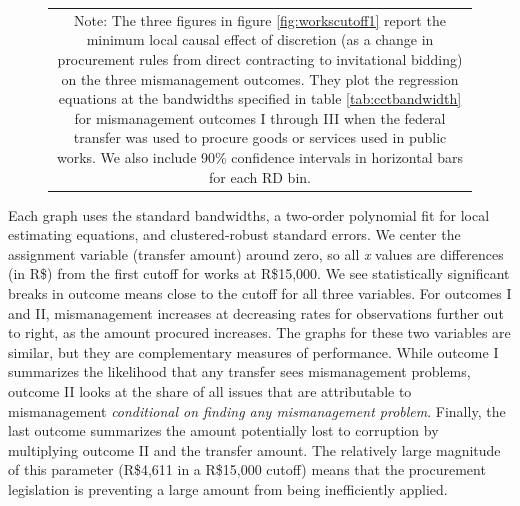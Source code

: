\documentclass[11pt]{article}
\begin{document}
\begin{figure}[!htbp]
\begin{tabular}{ccc}
  \multicolumn{3}{p{\textwidth}}{\scriptsize Note: The three figures in figure \ref{fig:workscutoff1} report the minimum local causal effect of discretion (as a change in procurement rules from direct contracting to invitational bidding) on the three mismanagement outcomes. They plot the regression equations at the bandwidths specified in table \ref{tab:cctbandwidth} for mismanagement outcomes I through III when the federal transfer was used to procure goods or services used in public works. We also include 90\% confidence intervals in horizontal bars for each RD bin.}
  \end{tabular}
\end{figure}

Each graph uses the standard \citet{CalonicoOptimalDataDrivenRegression2015} bandwidths, a two-order polynomial fit for local estimating equations, and clustered-robust standard errors. We center the assignment variable (transfer amount) around zero, so all \emph{x} values are differences (in R\$) from the first cutoff for works at R\$15,000. We see statistically significant breaks in outcome means close to the cutoff for all three variables. For outcomes I and II, mismanagement increases at decreasing rates for observations further out to right, as the amount procured increases. The graphs for these two variables are similar, but they are complementary measures of performance. While outcome I summarizes the likelihood that any transfer sees mismanagement problems, outcome II looks at the share of all issues that are attributable to mismanagement \emph{conditional on finding any mismanagement problem}. Finally, the last outcome summarizes the amount potentially lost to corruption by multiplying outcome II and the transfer amount. The relatively large magnitude of this parameter (R\$4,611 in a R\$15,000 cutoff) means that the procurement legislation is preventing a large amount from being inefficiently applied.
\end{document}
